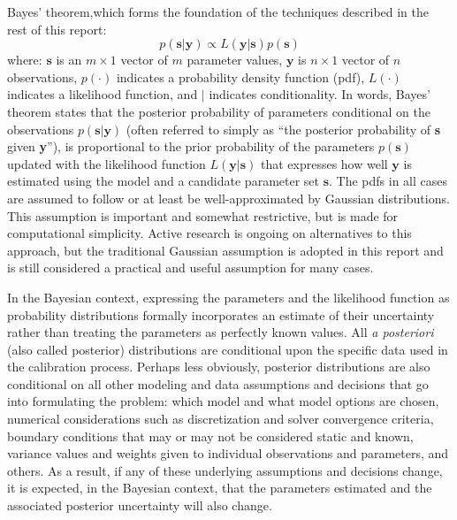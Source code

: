 \documentclass[11pt,oneside,onecolumn]{usgsreport}
\begin{document}
\begin{multicols}{2}
Bayes' theorem,which forms the foundation of the techniques described
in the rest of this report:
\begin{equation}
p\left(\mathbf{s}|\mathbf{y}\right)\propto L\left(\mathbf{y}|\mathbf{s}\right)p\left(\mathbf{s}\right)\label{eq:bayes1}
\end{equation}
where: $\mathbf{s}$ is an $m\times1$ vector of $m$ parameter values,
$\mathbf{y}$ is $n\times1$ vector of $n$ observations, $p\left(\cdot\right)$
indicates a probability density function (pdf), $L\left(\cdot\right)$
indicates a likelihood function, and $|$ indicates conditionality.
In words, Bayes' theorem states that the posterior probability of
parameters conditional on the observations $p\left(\mathbf{s}|\mathbf{y}\right)$
(often referred to simply as ``the posterior probability of \textbf{s}
given \textbf{y}''), is proportional to the prior probability of
the parameters $p\left(\mathbf{s}\right)$ updated with the likelihood
function $L\left(\mathbf{y}|\mathbf{s}\right)$ that expresses how
well $\mathbf{y}$ is estimated using the model and a candidate parameter
set $\mathbf{s}$. The pdfs in all cases are assumed to follow or
at least be well-approximated by Gaussian distributions. This assumption
is important and somewhat restrictive, but is made for computational
simplicity. Active research is ongoing on alternatives to this approach,
but the traditional Gaussian assumption is adopted in this report
and is still considered a practical and useful assumption for many
cases.

In the Bayesian context, expressing the parameters and the likelihood
function as probability distributions formally incorporates an estimate
of their uncertainty rather than treating the parameters as perfectly
known values. All \emph{a posteriori }(also called posterior) distributions
are conditional upon the specific data used in the calibration process.
Perhaps less obviously, posterior distributions are also conditional
on all other modeling and data assumptions and decisions that go into
formulating the problem: which model and what model options are chosen,
numerical considerations such as discretization and solver convergence
criteria, boundary conditions that may or may not be considered static
and known, variance values and weights given to individual observations
and parameters, and others. As a result, if any of these underlying
assumptions and decisions change, it is expected, in the Bayesian
context, that the parameters estimated and the associated posterior
uncertainty will also change. 


\end{multicols}
\end{document}
